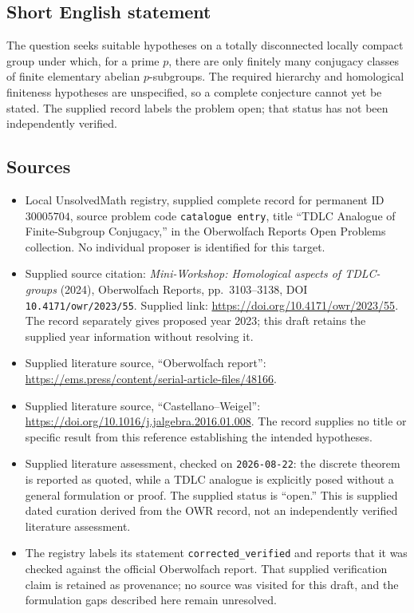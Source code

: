 \documentclass[11pt]{article}
\begin{document}
\subsection{Short English statement}
The question seeks suitable hypotheses on a totally disconnected locally compact group under which, for a prime \(p\), there are only finitely many conjugacy classes of finite elementary abelian \(p\)-subgroups. The required hierarchy and homological finiteness hypotheses are unspecified, so a complete conjecture cannot yet be stated. The supplied record labels the problem open; that status has not been independently verified.
\subsection{Sources}
\begin{itemize}
\item Local UnsolvedMath registry, supplied complete record for permanent ID \(30005704\), source problem code \texttt{catalogue entry}, title ``TDLC Analogue of Finite-Subgroup Conjugacy,'' in the Oberwolfach Reports Open Problems collection. No individual proposer is identified for this target.
\item Supplied source citation: \emph{Mini-Workshop: Homological aspects of TDLC-groups} (2024), Oberwolfach Reports, pp.\ 3103--3138, DOI \texttt{10.4171/owr/2023/55}. Supplied link: \url{https://doi.org/10.4171/owr/2023/55}. The record separately gives proposed year 2023; this draft retains the supplied year information without resolving it.
\item Supplied literature source, ``Oberwolfach report'': \url{https://ems.press/content/serial-article-files/48166}.
\item Supplied literature source, ``Castellano--Weigel'': \url{https://doi.org/10.1016/j.jalgebra.2016.01.008}. The record supplies no title or specific result from this reference establishing the intended hypotheses.
\item Supplied literature assessment, checked on \texttt{2026-08-22}: the discrete theorem is reported as quoted, while a TDLC analogue is explicitly posed without a general formulation or proof. The supplied status is ``open.'' This is supplied dated curation derived from the OWR record, not an independently verified literature assessment.
\item The registry labels its statement \texttt{corrected\_verified} and reports that it was checked against the official Oberwolfach report. That supplied verification claim is retained as provenance; no source was visited for this draft, and the formulation gaps described here remain unresolved.
\end{itemize}
\end{document}
